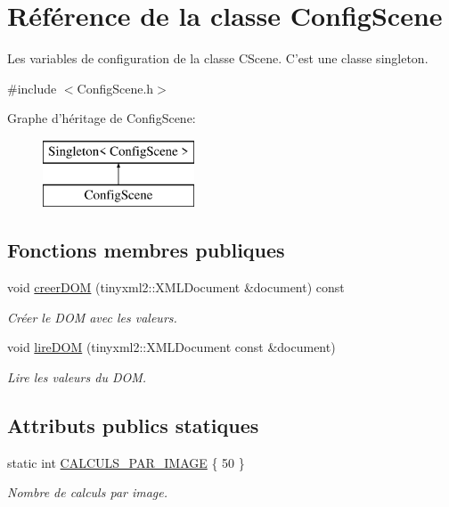 \hypertarget{class_config_scene}{\section{Référence de la classe Config\-Scene}
\label{class_config_scene}
}


Les variables de configuration de la classe C\-Scene. C'est une classe singleton.  




{\ttfamily \#include $<$Config\-Scene.\-h$>$}

Graphe d'héritage de Config\-Scene\-:\begin{figure}[H]
\begin{center}
\leavevmode
\includegraphics[height=2.000000cm]{class_config_scene}
\end{center}
\end{figure}
\subsection*{Fonctions membres publiques}
\begin{DoxyCompactItemize}
\item 
void \hyperlink{group__inf2990_ga3d0152df0c8c134ecd1a1741302db839}{creer\-D\-O\-M} (tinyxml2\-::\-X\-M\-L\-Document \&document) const 
\begin{DoxyCompactList}\small\item\em Créer le D\-O\-M avec les valeurs. \end{DoxyCompactList}\item 
void \hyperlink{group__inf2990_gaeacd60be947ce76a1302f6bbb40c90b1}{lire\-D\-O\-M} (tinyxml2\-::\-X\-M\-L\-Document const \&document)
\begin{DoxyCompactList}\small\item\em Lire les valeurs du D\-O\-M. \end{DoxyCompactList}\end{DoxyCompactItemize}
\subsection*{Attributs publics statiques}
\begin{DoxyCompactItemize}
\item 
\hypertarget{group__inf2990_gadb487b450a0314a5d1f75cf31ce502eb}{static int \hyperlink{group__inf2990_gadb487b450a0314a5d1f75cf31ce502eb}{C\-A\-L\-C\-U\-L\-S\-\_\-\-P\-A\-R\-\_\-\-I\-M\-A\-G\-E} \{ 50 \}}\label{group__inf2990_gadb487b450a0314a5d1f75cf31ce502eb}

\begin{DoxyCompactList}\small\item\em Nombre de calculs par image. \end{DoxyCompactList}\end{DoxyCompactItemize}
